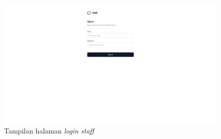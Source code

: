 \begin{enumerate}[label=\alph*)., leftmargin=1\parindent]
	
	\begin{figure}[H]
		\centering
		\includegraphics[keepaspectratio, width=15cm]{gambar/view_staff_login.png}
		\caption{Tampilan halaman \textit{login staff}}
		\label{gambar:view_staff_login.png}
	\end{figure}
	

\end{enumerate}
